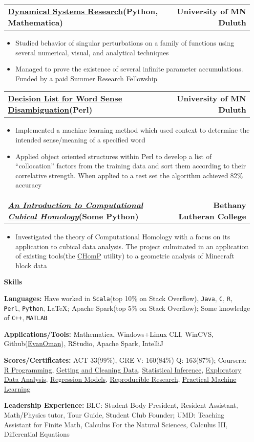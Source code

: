 \documentclass[letterpaper,10pt]{article}
\newcommand{\myitem}{\item[$\triangleright$]}
\newcommand{\resHeading}[1]{{
		\begin{tcolorbox}[size=title, sharp corners, colback=mygrey, colframe=mygrey]
			\centering\textbf{\large #1}
		\end{tcolorbox} 
	}}
\newcommand{\twoColSubHeading}[2]{
		\begin{tabularx}{\columnwidth}{Xr}
				\textbf{#1} & \textbf{#2}
		\end{tabularx}
	}
\begin{document}
		\twoColSubHeading{\href{https://www.researchgate.net/publication/281248352_Infinite_Levels_of_Complexity_in_a_Family_of_One-Dimensional_Singular_Dynamical_Systems}{Dynamical Systems Research}(Python, Mathematica)}{University of MN Duluth}
			\begin{itemize}
				\myitem Studied behavior of singular perturbations on a family of functions using several numerical, visual, and analytical techniques
				\myitem Managed to prove the existence of several infinite parameter accumulations. Funded by a paid Summer Research Fellowship
			\end{itemize}
		\twoColSubHeading{\href{https://github.com/EvanOman/nlp-decision-list}{Decision List for Word Sense Disambiguation}(Perl)}{University of MN Duluth}
			\begin{itemize}
				\myitem Implemented a machine learning method which used context to determine the intended sense/meaning of a specified word
				\myitem Applied object oriented structures within Perl to develop a list of ``collocation'' factors from the training data and sort them according to their correlative strength. When applied to a test set the algorithm achieved 82\% accuracy
			\end{itemize}
		\twoColSubHeading{\href{https://drive.google.com/file/d/0B5IOv9SzzDlvdnowZVpKRzhXOU0/edit?usp=sharing}{\textit{An Introduction to Computational Cubical Homology}}(Some Python)}{Bethany Lutheran College}
			\begin{itemize}
				\myitem Investigated the theory of Computational Homology with a focus on its application to cubical data analysis. The project culminated in an application of existing tools(the \href{http://chomp.rutgers.edu/}{CHomP} utility) to a geometric analysis of Minecraft block data
			\end{itemize}
	\resHeading{Skills}
		\textbf{Languages:}
			Have worked in \verb!Scala!(top 10\% on Stack Overflow), \verb!Java!, \verb!C!, \verb!R!, \verb!Perl!, \verb!Python!, \LaTeX; Apache Spark(top 5\% on Stack Overflow); Some knowledge of \verb!C++!, \verb!MATLAB!

		\textbf{Applications/Tools:}
		Mathematica, Windows+Linux CLI, WinCVS, Github(\href{https://www.github.com/EvanOman}{EvanOman}), RStudio, Apache Spark, IntelliJ

		\textbf{Scores/Certificates:}
		ACT 33(99\%), GRE V: 160(84\%) Q: 163(87\%); Coursera: \href{https://www.coursera.org/account/accomplishments/records/cxq3vN5HB76be56t}{R Programming}, \href{https://www.coursera.org/account/accomplishments/records/Xt3sCA24Qz3Par7M}{Getting and Cleaning Data}, \href{https://www.coursera.org/account/accomplishments/records/yPex7nURcXCYdsse}{Statistical Inference}, \href{https://www.coursera.org/account/accomplishments/records/XMkgJcmHPGtNBXsU}{Exploratory Data Analysis}, \href{https://www.coursera.org/account/accomplishments/records/Qx8qaDCvw9ZNQtqP}{Regression Models}, \href{https://www.coursera.org/account/accomplishments/records/g5LfcvAD5rJuEnGX}{Reproducible Research},
		\href{https://www.coursera.org/account/accomplishments/verify/ZNTJVMJKSH}{Practical Machine Learning}

		\textbf{Leadership Experience:}
		BLC: Student Body President, Resident Assistant, Math/Physics tutor, Tour Guide, Student Club Founder; UMD: Teaching Assistant for Finite Math, Calculus For the Natural Sciences, Calculus III, Differential Equations
\end{document}

